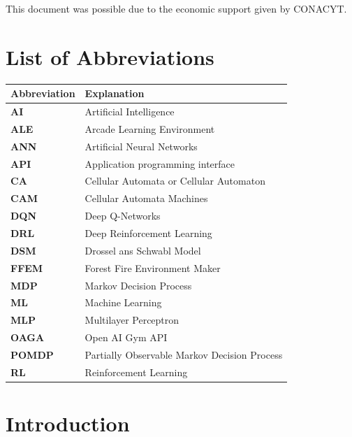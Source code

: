 \documentclass[
  12pt,
  openany]{book}
\begin{document}
\begin{flushright}
\footnotesize{This document was possible due to the economic support given by CONACYT.}
\end{flushright}

\tableofcontents

\listoffigures

\listoftables

\hypertarget{list-of-abbreviations}{%
\chapter*{List of Abbreviations}\label{list-of-abbreviations}}

\begin{tabular}{>{\bfseries}ll}
\toprule
Abbreviation & Explanation\\
\midrule
AI & Artificial Intelligence\\
ALE & Arcade Learning Environment\\
ANN & Artificial Neural Networks\\
API & Application programming interface\\
CA & Cellular Automata or Cellular Automaton\\
\addlinespace
CAM & Cellular Automata Machines\\
DQN & Deep Q-Networks\\
DRL & Deep Reinforcement Learning\\
DSM & Drossel ans Schwabl Model\\
FFEM & Forest Fire Environment Maker\\
\addlinespace
MDP & Markov Decision Process\\
ML & Machine Learning\\
MLP & Multilayer Perceptron\\
OAGA & Open AI Gym API\\
POMDP & Partially Observable Markov Decision Process\\
\addlinespace
RL & Reinforcement Learning\\
\bottomrule
\end{tabular}



\hypertarget{introduction}{%
\chapter{Introduction}\label{introduction}}
\end{document}
